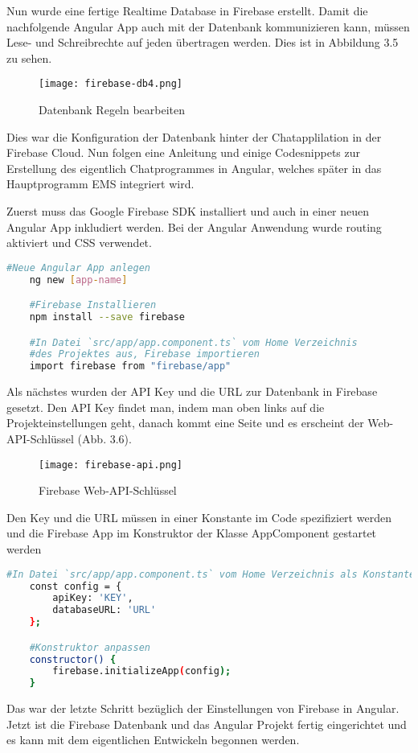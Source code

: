 Nun wurde eine fertige Realtime Database in Firebase erstellt. Damit die nachfolgende Angular App auch mit der Datenbank kommunizieren kann, müssen Lese- und Schreibrechte auf
jeden übertragen werden. Dies ist in Abbildung 3.5 zu sehen.
\begin{center}
    \begin{figure}[H]
        \centering
        \texttt{[image: firebase-db4.png]}
        \caption{Datenbank Regeln bearbeiten}
    \end{figure}
\end{center}
Dies war die Konfiguration der Datenbank hinter der Chatapplilation in der Firebase Cloud. Nun folgen eine Anleitung und einige Codesnippets zur Erstellung des eigentlich Chatprogrammes in Angular, welches später in das Hauptprogramm
EMS integriert wird.

Zuerst muss das Google Firebase SDK installiert und auch in einer neuen Angular App inkludiert werden. Bei der Angular Anwendung wurde routing aktiviert und CSS verwendet.
\begin{lstlisting}[language=bash]
    #Neue Angular App anlegen
    ng new [app-name]

    #Firebase Installieren
    npm install --save firebase

    #In Datei `src/app/app.component.ts` vom Home Verzeichnis 
    #des Projektes aus, Firebase importieren
    import firebase from "firebase/app"
\end{lstlisting}

Als nächstes wurden der API Key und die URL zur Datenbank in Firebase gesetzt. Den API Key findet man, indem man oben links auf die Projekteinstellungen geht, danach kommt eine Seite und es erscheint der Web-API-Schlüssel (Abb. 3.6).
\begin{center}
    \begin{figure}[H]
        \centering
        \texttt{[image: firebase-api.png]}
        \caption{Firebase Web-API-Schlüssel}
    \end{figure}
\end{center}
Den Key und die URL müssen in einer Konstante im Code spezifiziert werden und die Firebase App im Konstruktor der Klasse AppComponent gestartet werden
\begin{lstlisting}[language=bash]
    #In Datei `src/app/app.component.ts` vom Home Verzeichnis als Konstante zu definieren
    const config = {
        apiKey: 'KEY',
        databaseURL: 'URL'
    };

    #Konstruktor anpassen
    constructor() {
        firebase.initializeApp(config);
    }
\end{lstlisting}
Das war der letzte Schritt bezüglich der Einstellungen von Firebase in Angular. Jetzt ist die Firebase Datenbank und das Angular Projekt fertig eingerichtet und es kann mit dem eigentlichen Entwickeln begonnen werden.

